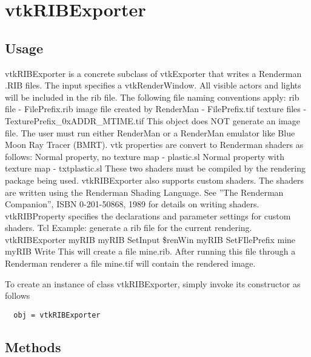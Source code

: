 \section{vtkRIBExporter}

\subsection{Usage}

 vtkRIBExporter is a concrete subclass of vtkExporter that writes a
 Renderman .RIB files. The input specifies a vtkRenderWindow. All
 visible actors and lights will be included in the rib file. The
 following file naming conventions apply:
   rib file - FilePrefix.rib
   image file created by RenderMan - FilePrefix.tif
   texture files - TexturePrefix\_0xADDR\_MTIME.tif
 This object does NOT generate an image file. The user must run either
 RenderMan or a RenderMan emulator like Blue Moon Ray Tracer (BMRT).
 vtk properties are convert to Renderman shaders as follows:
   Normal property, no texture map - plastic.sl
   Normal property with texture map - txtplastic.sl
 These two shaders must be compiled by the rendering package being
 used.  vtkRIBExporter also supports custom shaders. The shaders are
 written using the Renderman Shading Language. See ''The Renderman
 Companion'', ISBN 0-201-50868, 1989 for details on writing shaders.
 vtkRIBProperty specifies the declarations and parameter settings for
 custom shaders.
 Tcl Example: generate a rib file for the current rendering.
 vtkRIBExporter myRIB
   myRIB SetInput \$renWin
   myRIB SetFIlePrefix mine
   myRIB Write
 This will create a file mine.rib. After running this file through
 a Renderman renderer a file mine.tif will contain the rendered image.


To create an instance of class vtkRIBExporter, simply
invoke its constructor as follows
\begin{verbatim}
  obj = vtkRIBExporter
\end{verbatim}
\subsection{Methods}

